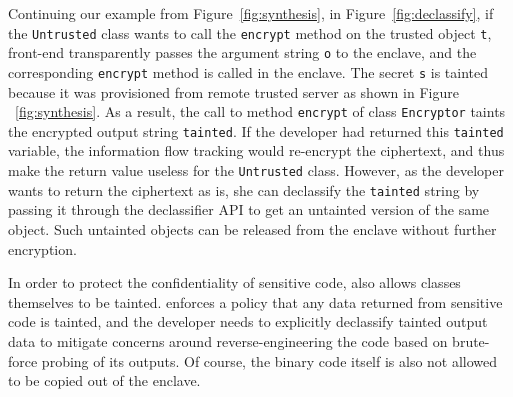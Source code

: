 Continuing our example from Figure~\ref{fig:synthesis}, in Figure~\ref{fig:declassify}, if the {\tt Untrusted} class wants to call the {\tt encrypt} method on the trusted object {\tt t}, \sysname{} front-end transparently passes the argument string {\tt o} to the enclave, and the corresponding {\tt encrypt} method is called in the enclave. The secret {\tt s} is tainted because it was provisioned from remote trusted server as shown in Figure ~\ref{fig:synthesis}. As a result, the call to method {\tt encrypt} of class {\tt Encryptor} taints the encrypted output string {\tt tainted}. If the developer had returned this {\tt tainted} variable, the \sysname{} information flow tracking would re-encrypt the ciphertext, and thus make the return value useless for the {\tt Untrusted} class. However, as the developer wants to return the ciphertext as is, she can declassify the {\tt tainted} string by passing it through the declassifier API to get an untainted version of the same object. Such untainted objects can be released from the enclave without further encryption.


In order to protect the confidentiality of sensitive code,
\sysname{} also allows classes themselves to be tainted.
\sysname{} enforces a policy that any data returned from sensitive code is tainted, and the developer needs to explicitly declassify tainted output data to mitigate
concerns around reverse-engineering the code based on brute-force probing of its outputs.
Of course, the binary code itself is also not allowed to be copied out of the enclave.


%
